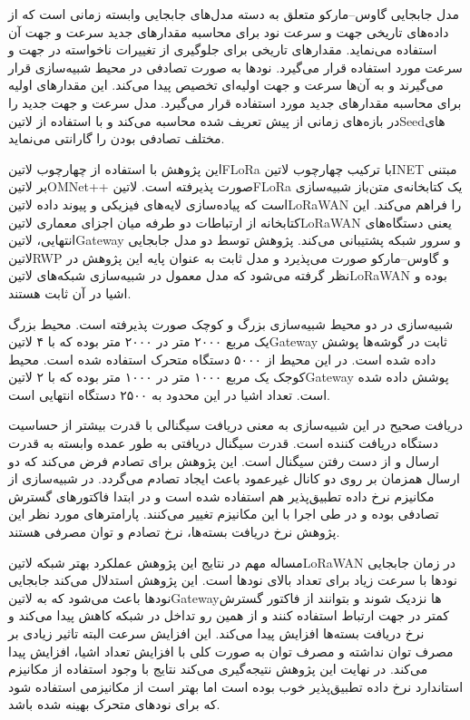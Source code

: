 مدل جابجایی گاوس--مارکو متعلق به دسته مدل‌های جابجایی وابسته زمانی است که از داده‌های تاریخی جهت و سرعت نود برای محاسبه
مقدارهای جدید سرعت و جهت آن استفاده می‌نماید. مقدارهای تاریخی برای جلوگیری از تغییرات ناخواسته در جهت و سرعت مورد استفاده قرار می‌گیرد.
نودها به صورت تصادفی در محیط شبیه‌سازی قرار می‌گیرند و به آن‌ها سرعت و جهت اولیه‌ای تخصیص پیدا می‌کند.
این مقدارهای اولیه برای محاسبه مقدارهای جدید مورد استفاده قرار می‌گیرد.
مدل سرعت و جهت جدید را در بازه‌های زمانی از پیش تعریف شده محاسبه می‌کند و با استفاده از ‌لاتین{Seed}های مختلف تصادفی بودن را گارانتی می‌نماید.

این پژوهش با استفاده از چهارچوب ‌لاتین{FLoRa} با ترکیب چهارچوب ‌لاتین{INET} مبتنی بر ‌لاتین{OMNet++} صورت پذیرفته است.
‌لاتین{FLoRa} یک کتابخانه‌ی متن‌باز شبیه‌سازی است که پیاده‌سازی لایه‌های فیزیکی و پیوند داده ‌لاتین{LoRaWAN} را فراهم می‌کند.
این کتابخانه از ارتباطات دو طرفه میان اجزای معماری ‌لاتین{LoRaWAN} یعنی دستگاه‌های انتهایی، ‌لاتین{Gateway} و سرور شبکه پشتیبانی می‌کند.
پژوهش توسط دو مدل جابجایی ‌لاتین{RWP} و گاوس--مارکو صورت می‌پذیرد و مدل ثابت به عنوان پایه این پژوهش در نظر گرفته می‌شود که مدل معمول
در شبیه‌سازی شبکه‌های ‌لاتین{LoRaWAN} بوده و اشیا در آن ثابت هستند.

شبیه‌سازی در دو محیط شبیه‌سازی بزرگ و کوچک صورت پذیرفته است. محیط بزرگ یک مربع ۲۰۰۰ متر در ۲۰۰۰ متر بوده که با ۴ ‌لاتین{Gateway}
ثابت در گوشه‌ها پوشش داده شده است. در این محیط از ۵۰۰۰ دستگاه متحرک استفاده شده است.
محیط کوجک یک مربع ۱۰۰۰ متر در ۱۰۰۰ متر بوده که با ۲ ‌لاتین{Gateway} پوشش داده شده است.
تعداد اشیا در این محدود به ۲۵۰۰ دستگاه انتهایی است.

دریافت صحیح در این شبیه‌سازی به معنی دریافت سیگنالی با قدرت بیشتر از حساسیت دستگاه دریافت کننده است.
قدرت سیگنال دریافتی به طور عمده وابسته به قدرت ارسال و از دست رفتن سیگنال است.
این پژوهش برای تصادم فرض می‌کند که دو ارسال همزمان بر روی دو کانال غیرعمود باعث ایجاد تصادم می‌گردد.
در شبیه‌سازی از مکانیزم نرخ داده تطبیق‌پذیر هم استفاده شده است و در ابتدا فاکتورهای گسترش تصادفی بوده و در طی اجرا با این مکانیزم
تغییر می‌کنند. پارامترهای مورد نظر این پژوهش نرخ دریافت بسته‌ها، نرخ تصادم و توان مصرفی هستند.

مساله مهم در نتایج این پژوهش عملکرد بهتر شبکه ‌لاتین{LoRaWAN} در زمان جابجایی نودها با سرعت زیاد برای تعداد بالای نودها است.
این پژوهش استدلال می‌کند جابجایی نودها باعث می‌شود که به ‌لاتین{Gateway}ها نزدیک شوند و بتوانند از فاکتور گسترش
کمتر در جهت ارتباط استفاده کنند و از همین رو تداخل در شبکه کاهش پیدا می‌کند و نرخ دریافت بسته‌ها افزایش پیدا می‌کند.
این افزایش سرعت البته تاثیر زیادی بر مصرف توان نداشته و مصرف توان به صورت کلی با افزایش تعداد اشیا، افزایش پیدا می‌کند.
در نهایت این پژوهش نتیجه‌گیری می‌کند نتایج با وجود استفاده از مکانیزم استاندارد نرخ داده تطبیق‌پذیر خوب بوده است اما
بهتر است از مکانیزمی استفاده شود که برای نودهای متحرک بهینه شده باشد.

